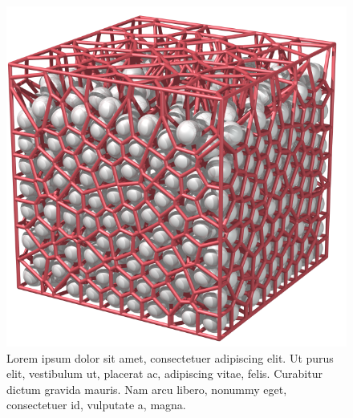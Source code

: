%
\begin{figure}%
    \begin{minipage}[b]{0.4999\textwidth}%
    \captionsetup{width=.9\textwidth}%
        \centering%
        \includegraphics[width=\textwidth]{images/voronoi/import_AM2_A001.png}%
        \caption{%
            Lorem ipsum dolor sit amet, consectetuer adipiscing elit. Ut purus elit, vestibulum ut, placerat ac, adipiscing vitae, felis. Curabitur dictum gravida mauris. Nam arcu libero, nonummy eget, consectetuer id, vulputate a, magna.%
            \label{fig:a}%
        }%
    \end{minipage}%
    \hfill%
    \begin{minipage}[b]{0.4999\textwidth}%
        \captionsetup{width=.9\textwidth}%
        \centering%
        \caption{%
            Lorem ipsum dolor sit amet, consectetuer adipiscing elit. Ut purus elit, vestibulum ut, placerat ac, adipiscing vitae, felis. Curabitur dictum gravida mauris. Nam arcu libero, nonummy eget, consectetuer id, vulputate a, magna.%
            \label{fig:b}%
        }%
    \end{minipage}%
\end{figure}%

